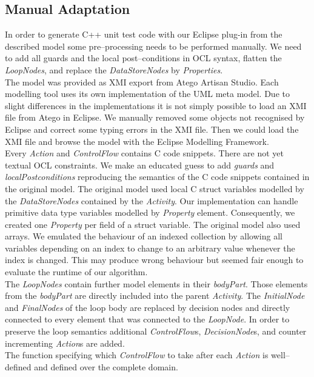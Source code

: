 \documentclass[runningheads,a4paper]{llncs}%
\newcommand{\UMLType}[1]{\textsf{\textit{#1}}} %
\newcommand{\UMLReference}[1]{\textsf{\textit{#1}}} %
\begin{document}
\subsection{Manual Adaptation}
In order to generate C++ unit test code with our Eclipse plug-in from the described model some pre--processing needs to be performed manually. We need to add all guards and the local post--conditions in OCL syntax, flatten the \UMLType{LoopNodes}, and replace the \UMLType{DataStoreNodes} by \UMLType{Properties}.\\
The model was provided as XMI export from Atego\textsuperscript{\textregistered} Artisan Studio. Each modelling tool uses its own implementation of the UML meta model. Due to slight differences in the implementations it is not simply possible to load an XMI file from Atego\textsuperscript{\textregistered} in Eclipse. We manually removed some objects not recognised by Eclipse and correct some typing errors in the XMI file. Then we could load the XMI file and browse the model with the Eclipse Modelling Framework.\\
Every \UMLType{Action} and \UMLReference{ControlFlow} contains C code snippets. There are not yet textual OCL constraints. We make an educated guess to add \UMLReference{guards} and \UMLReference{localPostconditions} reproducing the semantics of the C code snippets contained in the original model. The original model used local C struct variables modelled by the \UMLType{DataStoreNodes} contained by the \UMLType{Activity}. Our implementation can handle primitive data type variables modelled by \UMLType{Property} element. Consequently, we created one \UMLType{Property} per field of a struct variable. The original model also used arrays. We emulated the behaviour of an indexed collection by allowing all variables depending on an index to change to an arbitrary value whenever the index is changed. This may produce wrong behaviour but seemed fair enough to evaluate the runtime of our algorithm.\\
The \UMLType{LoopNodes} contain further model elements in their \UMLReference{bodyPart}. Those elements from the \UMLReference{bodyPart} are directly included into the parent \UMLType{Activity}. The \UMLType{InitialNode} and \UMLType{FinalNodes} of the loop body are replaced by decision nodes and directly connected to every element that was connected to the \UMLType{LoopNode}. In order to preserve the loop semantics additional \UMLType{ControlFlow}s, \UMLType{DecisionNode}s, and counter incrementing \UMLType{Action}s are added.\\
The function specifying which \UMLType{ControlFlow} to take after each \UMLType{Action} is well--defined and defined over the complete domain. 
\end{document}
